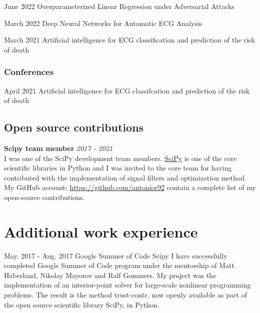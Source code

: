 \documentclass[10pt,letterpaper]{article} %
\begin{document}
    
    { June 2022 }
    { Overparameterized Linear Regression under Adversarial Attacks  }
    { }{}
    

    
    { March 2022 }
    { Deep Neural Networks for Automatic ECG Analysis  }
    { }{}
    

    
    { March 2021 }
    { Artificial intelligence for ECG classification and prediction of the risk of death  }
    { }{}
    


\subsubsection*{Conferences}


    
    { April 2021 }
    { Artificial intelligence for ECG classifcation and prediction of the risk of death  }
    { }{}
    



\subsection*{Open source contributions}

{\bf Scipy team member} \hfill {\em 2017 - 2021} \\
I was one of the SciPy development team members.
\href{https://www.scipy.org}{SciPy} is one of the core scientific libraries in Python and I was invited to the core team
for having contributed with the implementation of signal filters
and optimization method.
My GitHub account: \href{https://github.com/antonior92}{https://github.com/antonior92}
contain a complete list of my open-source contributions.

\section*{Additional work experience} %


    { May. 2017 -   Aug. 2017 }
    { Google Summer of Code }
    { Scipy }
    { I have successfully completed Google Summer of Code program under the mentorship of Matt Haberland, Nikolay Mayorov and Ralf Gommers. My project was the implementation of an interior-point solver for large-scale nonlinear programming problems. The result is the method trust-contr, now openly available as part of the open source scientific library SciPy, in Python. }
\end{document}

